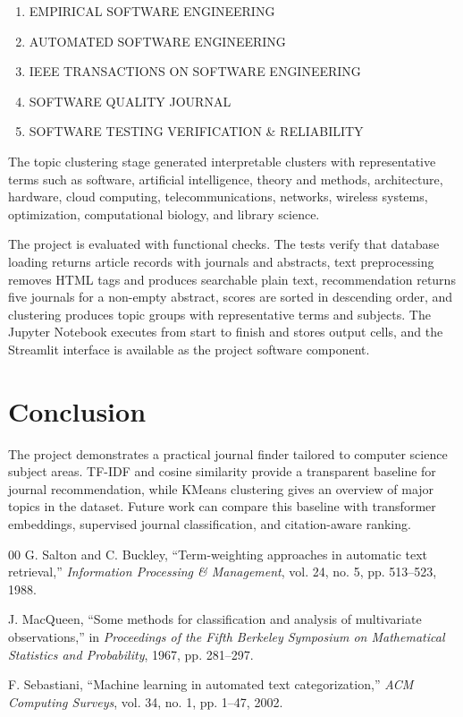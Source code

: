 \documentclass[conference]{IEEEtran}
\begin{document}
\begin{enumerate}
\item EMPIRICAL SOFTWARE ENGINEERING
\item AUTOMATED SOFTWARE ENGINEERING
\item IEEE TRANSACTIONS ON SOFTWARE ENGINEERING
\item SOFTWARE QUALITY JOURNAL
\item SOFTWARE TESTING VERIFICATION \& RELIABILITY
\end{enumerate}

The topic clustering stage generated interpretable clusters with representative terms such as software, artificial intelligence, theory and methods, architecture, hardware, cloud computing, telecommunications, networks, wireless systems, optimization, computational biology, and library science.

The project is evaluated with functional checks. The tests verify that database loading returns article records with journals and abstracts, text preprocessing removes HTML tags and produces searchable plain text, recommendation returns five journals for a non-empty abstract, scores are sorted in descending order, and clustering produces topic groups with representative terms and subjects. The Jupyter Notebook executes from start to finish and stores output cells, and the Streamlit interface is available as the project software component.

\section{Conclusion}
The project demonstrates a practical journal finder tailored to computer science subject areas. TF-IDF and cosine similarity provide a transparent baseline for journal recommendation, while KMeans clustering gives an overview of major topics in the dataset. Future work can compare this baseline with transformer embeddings, supervised journal classification, and citation-aware ranking.

\begin{thebibliography}{00}
G. Salton and C. Buckley, ``Term-weighting approaches in automatic text retrieval,'' \emph{Information Processing \& Management}, vol. 24, no. 5, pp. 513--523, 1988.

J. MacQueen, ``Some methods for classification and analysis of multivariate observations,'' in \emph{Proceedings of the Fifth Berkeley Symposium on Mathematical Statistics and Probability}, 1967, pp. 281--297.

F. Sebastiani, ``Machine learning in automated text categorization,'' \emph{ACM Computing Surveys}, vol. 34, no. 1, pp. 1--47, 2002.
\end{thebibliography}
\end{document}
